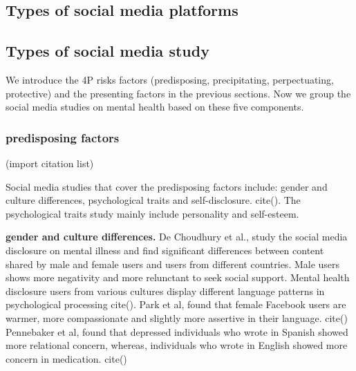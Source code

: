 \subsection{Types of social media platforms}



\subsection{Types of social media study} 
We introduce the 4P risks factors (predisposing, precipitating, perpectuating, protective) and the presenting factors in the previous sections. Now we group the social media studies on mental health based on these five components. 

\subsubsection{predisposing factors} (import citation list)

Social media studies that cover the predisposing factors include: gender and culture differences, psychological traits and self-disclosure. cite(). The psychological traits study mainly include personality and self-esteem.

 \textbf{gender and culture differences.} De Choudhury et al., study the social media disclosure on mental illness and find significant differences between content shared by male and female users and users from different countries. Male users shows more negativity and more relunctant to seek social support. Mental health disclosure users from various cultures display different language patterns in psychological processing cite(). Park et al, found that female Facebook users are warmer, more compassionate and slightly more assertive in their language. cite() Pennebaker et al, found that depressed individuals who wrote in Spanish showed more relational concern, whereas, individuals who wrote in English showed more concern in medication. cite()

